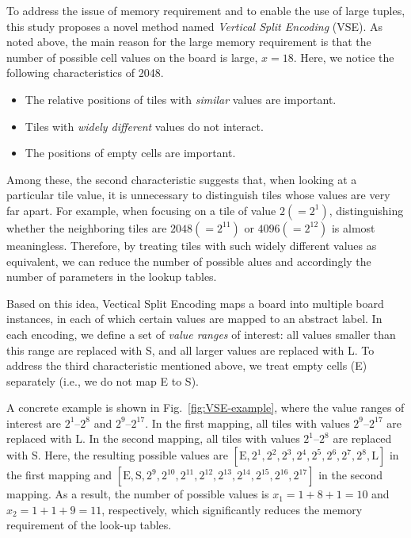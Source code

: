 To address the issue of memory requirement and to enable the use of large tuples, this study proposes a novel method named \emph{Vertical Split Encoding} (VSE).
As noted above, the main reason for the large memory requirement is that the number of possible cell values on the board is large, $x = 18$.
Here, we notice the following characteristics of 2048.
\begin{itemize}
 \item The relative positions of tiles with \emph{similar} values are important.
 \item Tiles with \emph{widely different} values do not interact.
 \item The positions of empty cells are important.
\end{itemize}
Among these, the second characteristic suggests that, when looking at a particular tile value, it is unnecessary to distinguish tiles whose values are very far apart. For example, when focusing on a tile of value $2 (=2^1)$, distinguishing whether the neighboring tiles are $2048 (=2^{11})$ or $4096 (=2^{12})$ is almost meaningless.
Therefore, by treating tiles with such widely different values as equivalent, we can reduce the number of possible alues and accordingly the number of parameters in the lookup tables.

Based on this idea, Vectical Split Encoding maps a board into multiple board instances, in each of which certain values are mapped to an abstract label.
In each encoding, we define a set of \emph{value ranges} of interest: all values smaller than this range are replaced with S, and all larger values are replaced with L.
To address the third characteristic mentioned above, we treat empty cells (E) separately (i.e., we do not map E to S).

A concrete example is shown in Fig.~\ref{fig:VSE-example}, where the value ranges of interest are $2^1$--$2^8$ and $2^9$--$2^{17}$.
In the first mapping, all tiles with values $2^{9}$--$2^{17}$ are replaced with L.
In the second mapping, all tiles with values $2^{1}$–$2^{8}$ are replaced with S.
Here, the resulting possible values are $[\mbox{E}, 2^1, 2^2, 2^3, 2^4, 2^5, 2^6, 2^7, 2^8, \mbox{L}]$ in the first mapping and $[\mbox{E}, \mbox{S}, 2^9, 2^{10}, 2^{11}, 2^{12}, 2^{13}, 2^{14}, 2^{15}, 2^{16}, 2^{17}]$ in the second mapping.
As a result, the number of possible values is $x_1 = 1 + 8 + 1 = 10$ and $x_2 = 1 + 1 + 9 = 11$, respectively, which significantly reduces the memory requirement of the look-up tables.

